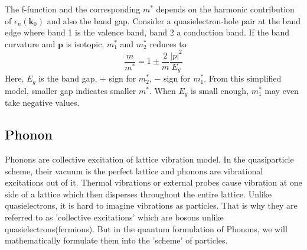 \documentclass{article}
\begin{document}
The f-function and the corresponding $m^*$ depends on the harmonic contribution of $\epsilon_n(\mathbf{k}_0)$ and also the band gap. Consider a quasielectron-hole pair at the band edge where band 1 is the valence band, band 2 a conduction band. If the band curvature and $\mathbf{p}$ is isotopic, $m_1^*$ and $m_2^*$ reduces to
$$\frac{m}{m^*}=1\pm\frac{2}{m}\frac{|p|^2}{E_g}$$
Here, $E_g$ is the band gap, $+$ sign for $m_2^*$, $-$ sign for $m_1^*$. From this simplified model, smaller gap indicates smaller $m^*$. When $E_g$ is small enough, $m_1^*$ may even take negative values. %
\subsection*{Phonon}
Phonons are collective excitation of lattice vibration model. In the quasiparticle scheme, their vacuum is the perfect lattice and phonons are vibrational excitations out of it. Thermal vibrations or external probes cause vibration at one side of a lattice which then disperses throughout the entire lattice. Unlike quasielectrons, it is hard to imagine vibrations as particles. That is why they are referred to as 'collective excitations' which are bosons unlike quasielectrons(fermions). But in the quantum formulation of Phonons, we will mathematically formulate them into the 'scheme' of particles.
\end{document}
